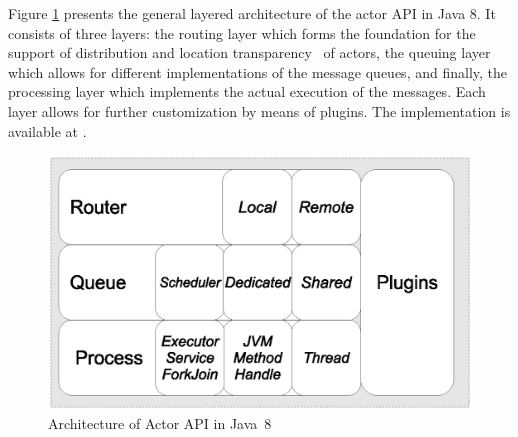 Figure \ref{ch03:fig:actors:arch} presents the general layered architecture of the actor API in Java 8.
It consists of  three layers: the  routing layer  which
forms the foundation for the support of distribution and location transparency~\cite{KarmaniSA09} of actors,
the queuing layer  which allows for different implementations of the message queues, and finally, the processing layer
which implements the actual execution of the messages.
Each layer  allows for further customization by means of plugins.
The implementation is available at .


% 

\begin{figure}[h]
\begin{center}
\includegraphics[scale=.6]{figs/abs-api-java8-2}  
\end{center}
\caption{Architecture of Actor API in Java~8}
\label{ch03:fig:actors:arch}
\end{figure} 

